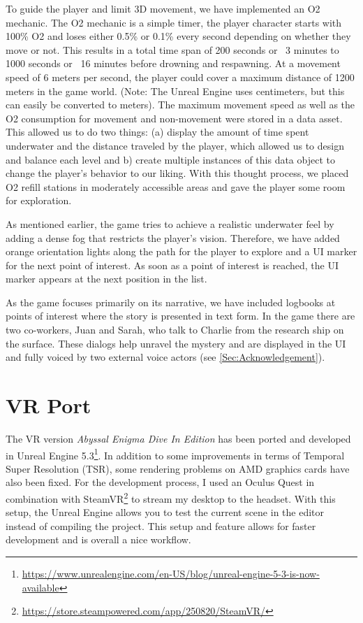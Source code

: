 \documentclass[letterpaper, 10 pt, conference]{ieeeconf}  %
\begin{document}
To guide the player and limit 3D movement, we have implemented an O2 mechanic.
The O2 mechanic is a simple timer, the player character starts with 100\% O2 and loses either 0.5\% or 0.1\% every second depending on whether they move or not.
This results in a total time span of 200 seconds or ~3 minutes to 1000 seconds or ~16 minutes before drowning and respawning.
At a movement speed of 6 meters per second, the player could cover a maximum distance of 1200 meters in the game world.
(Note: The Unreal Engine uses centimeters, but this can easily be converted to meters). 
The maximum movement speed as well as the O2 consumption for movement and non-movement were stored in a data asset.
This allowed us to do two things:
(a) display the amount of time spent underwater and the distance traveled by the player, which allowed us to design and balance each level
and b) create multiple instances of this data object to change the player's behavior to our liking.
With this thought process, we placed O2 refill stations in moderately accessible areas and gave the player some room for exploration.

As mentioned earlier, the game tries to achieve a realistic underwater feel by adding a dense fog that restricts the player's vision.
Therefore, we have added orange orientation lights along the path for the player to explore and a UI marker for the next point of interest.
As soon as a point of interest is reached, the UI marker appears at the next position in the list.

As the game focuses primarily on its narrative, we have included logbooks at points of interest where the story is presented in text form.
In the game there are two co-workers, Juan and Sarah, who talk to Charlie from the research ship on the surface.
These dialogs help unravel the mystery and are displayed in the UI and fully voiced by two external voice actors (see \ref{Sec:Acknowledgement}).

\section{VR Port}
\label{Sec:VR}
The VR version \textit{Abyssal Enigma Dive In Edition} has been ported and developed in Unreal Engine 5.3\footnote{\url{https://www.unrealengine.com/en-US/blog/unreal-engine-5-3-is-now-available}}.
In addition to some improvements in terms of Temporal Super Resolution (TSR), some rendering problems on AMD graphics cards have also been fixed.
For the development process, I used an Oculus Quest in combination with SteamVR\footnote{\url{https://store.steampowered.com/app/250820/SteamVR/}} to stream my desktop to the headset.
With this setup, the Unreal Engine allows you to test the current scene in the editor instead of compiling the project.
This setup and feature allows for faster development and is overall a nice workflow.
\end{document}

